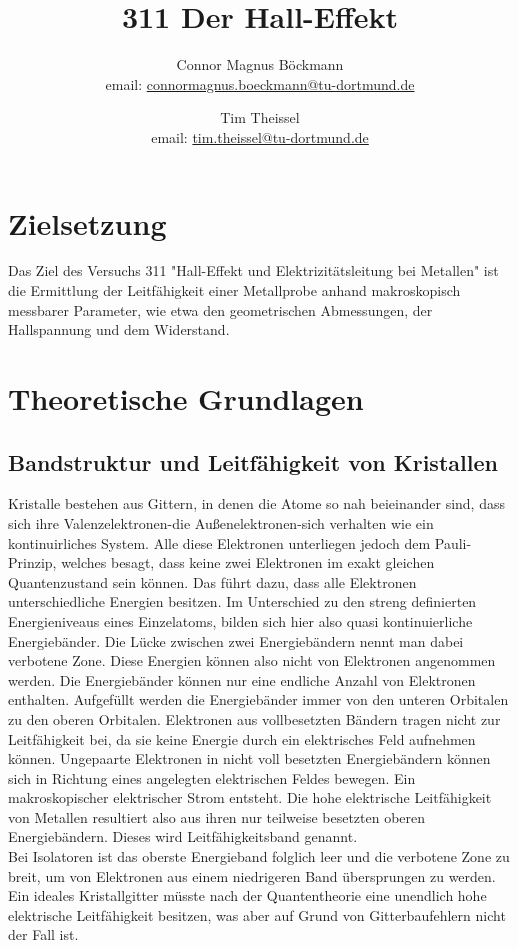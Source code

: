 \documentclass[titlepage=firstcover, captions=tableheading]{scrartcl}
\title{311 Der Hall-Effekt}
\author{
Connor Magnus Böckmann \\ email: \href{mailto:connormagnus.boeckmann@tu-dortmund.de}{connormagnus.boeckmann@tu-dortmund.de}
\and Tim Theissel \\ email: \href{mailto:tim.theissel@tu-dortmund.de}{tim.theissel@tu-dortmund.de}  
}
\begin{document}
\maketitle
\newpage
\tableofcontents
\newpage
\section{Zielsetzung}
Das Ziel des Versuchs 311 "Hall-Effekt und Elektrizitätsleitung bei Metallen" ist die Ermittlung der Leitfähigkeit einer Metallprobe anhand makroskopisch messbarer Parameter, wie etwa den geometrischen Abmessungen, der Hallspannung und dem Widerstand.

\section{Theoretische Grundlagen}
\subsection{Bandstruktur und Leitfähigkeit von Kristallen}
Kristalle bestehen aus Gittern, in denen die Atome so nah beieinander sind, dass sich ihre Valenzelektronen-die Außenelektronen-sich verhalten wie ein kontinuirliches System. Alle diese Elektronen unterliegen jedoch dem Pauli-Prinzip, welches besagt, dass keine zwei Elektronen im exakt gleichen Quantenzustand sein können. Das führt dazu, dass alle Elektronen unterschiedliche Energien besitzen. Im Unterschied zu den streng definierten Energieniveaus eines Einzelatoms, bilden sich hier also quasi kontinuierliche Energiebänder. Die Lücke zwischen zwei Energiebändern nennt man dabei verbotene Zone. Diese Energien können also nicht von Elektronen angenommen werden. Die Energiebänder können nur eine endliche Anzahl von Elektronen enthalten. Aufgefüllt werden die Energiebänder immer von den unteren Orbitalen zu den oberen Orbitalen. Elektronen aus vollbesetzten Bändern tragen nicht zur Leitfähigkeit bei, da sie keine Energie durch ein elektrisches Feld aufnehmen können. Ungepaarte Elektronen in nicht voll besetzten Energiebändern können sich in Richtung eines angelegten elektrischen Feldes bewegen. Ein makroskopischer elektrischer Strom entsteht. Die hohe elektrische Leitfähigkeit von Metallen resultiert also aus ihren nur teilweise besetzten oberen Energiebändern. Dieses wird Leitfähigkeitsband genannt. \\
Bei Isolatoren ist das oberste Energieband folglich leer und die verbotene Zone zu breit, um von Elektronen aus einem niedrigeren Band übersprungen zu werden. \\
Ein ideales Kristallgitter müsste nach der Quantentheorie eine unendlich hohe elektrische Leitfähigkeit besitzen, was aber auf Grund von Gitterbaufehlern nicht der Fall ist.
\end{document}
